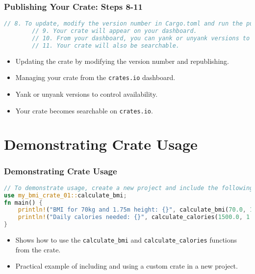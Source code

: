 \documentclass[aspectratio=169, table]{beamer}
\begin{document}
\begin{frame}[fragile]
	\frametitle{Publishing Your Crate: Steps 8-11}
	\begin{lstlisting}[language=Rust]
		// 8. To update, modify the version number in Cargo.toml and run the publish command again.
		// 9. Your crate will appear on your dashboard.
		// 10. From your dashboard, you can yank or unyank versions to control downloads.
		// 11. Your crate will also be searchable.
	\end{lstlisting}
	\begin{itemize}
		\item Updating the crate by modifying the version number and republishing.
		\item Managing your crate from the \texttt{crates.io} dashboard.
		\item Yank or unyank versions to control availability.
		\item Your crate becomes searchable on \texttt{crates.io}.
	\end{itemize}
\end{frame}


\section{Demonstrating Crate Usage}
\begin{frame}[fragile]
\frametitle{Demonstrating Crate Usage}
\begin{lstlisting}[language=Rust]
// To demonstrate usage, create a new project and include the following crate:
use my_bmi_crate_01::calculate_bmi; 
fn main() {
	println!("BMI for 70kg and 1.75m height: {}", calculate_bmi(70.0, 1.75));
	println!("Daily calories needed: {}", calculate_calories(1500.0, 1.2));
}
\end{lstlisting}
\begin{itemize}
\item Shows how to use the \texttt{calculate\_bmi} and \texttt{calculate\_calories} functions from the crate.
\item Practical example of including and using a custom crate in a new project.
\end{itemize}
\end{frame}
\end{document}
